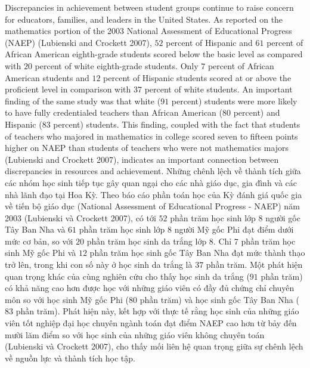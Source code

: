 \documentclass[
  10pt,
  a4paper,
  landscape,
  twoside,
  openany
]{scrbook}
\newcommand{\EN}[1]{#1}
\newcommand{\VI}[1]{#1}
\newcommand{\NOTE}[1]{#1}
\begin{document}
\TriPara
{
\EN{Discrepancies in achievement between student groups continue to raise concern for educators, families, and leaders in the United States. As reported on the mathematics portion of the 2003 National Assessment of Educational Progress (NAEP) (Lubienski and Crockett 2007), $52$ percent of Hispanic and $61$ percent of African American eighth-grade students scored below the basic level as compared with $20$ percent of white eighth-grade students. Only $7$ percent of African American students and $12$ percent of Hispanic students scored at or above the proficient level in comparison with $37$ percent of white students. An important finding of the same study was that white ($91$ percent) students were more likely to have fully credentialed teachers than African American ($80$ percent) and Hispanic ($83$ percent) students. This finding, coupled with the fact that students of teachers who majored in mathematics in college scored seven to fifteen points higher on NAEP than students of teachers who were not mathematics majors (Lubienski and Crockett 2007), indicates an important connection between discrepancies in resources and achievement.}
}
{
\VI{Những chênh lệch về thành tích giữa các nhóm học sinh tiếp tục gây quan ngại cho các nhà giáo dục, gia đình và các nhà lãnh đạo tại Hoa Kỳ. Theo báo cáo phần toán học của Kỳ đánh giá quốc gia về tiến bộ giáo dục (National Assessment of Educational Progress - NAEP) năm 2003 (Lubienski và Crockett 2007), có tới $52$ phần trăm học sinh lớp 8 người gốc Tây Ban Nha và $61$ phần trăm học sinh lớp 8 người Mỹ gốc Phi đạt điểm dưới mức cơ bản, so với $20$ phần trăm học sinh da trắng lớp 8. Chỉ $7$ phần trăm học sinh Mỹ gốc Phi và $12$ phần trăm học sinh gốc Tây Ban Nha đạt mức thành thạo trở lên, trong khi con số này ở học sinh da trắng là $37$ phần trăm. Một phát hiện quan trọng khác của cùng nghiên cứu cho thấy học sinh da trắng ($91$ phần trăm) có khả năng cao hơn được học với những giáo viên có đầy đủ chứng chỉ chuyên môn so với học sinh Mỹ gốc Phi ($80$ phần trăm) và học sinh gốc Tây Ban Nha ($83$ phần trăm). Phát hiện này, kết hợp với thực tế rằng học sinh của những giáo viên tốt nghiệp đại học chuyên ngành toán đạt điểm NAEP cao hơn từ bảy đến mười lăm điểm so với học sinh của những giáo viên không chuyên toán (Lubienski và Crockett 2007), cho thấy mối liên hệ quan trọng giữa sự chênh lệch về nguồn lực và thành tích học tập.}
}
{
\NOTE{}
}
\end{document}
